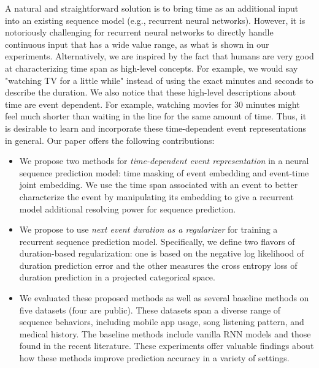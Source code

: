 \documentclass{article} %
\begin{document}
A natural and straightforward solution is to bring time as an additional input into an existing sequence model (e.g., recurrent neural networks). However, it is notoriously challenging for recurrent neural networks to directly handle continuous input that has a wide value range, as what is shown in our experiments. Alternatively, we are inspired by the fact that humans are very good at characterizing time span as high-level concepts. For example, we would say "watching TV for a little while" instead of using the exact minutes and seconds to describe the duration. We also notice that these high-level descriptions about time are event dependent. For example, watching movies for 30 minutes might feel much shorter than waiting in the line for the same amount of time. Thus, it is desirable to learn and incorporate these time-dependent event representations in general. Our paper offers the following contributions:
\begin{itemize}
\item{We propose two methods for \textit{time-dependent event representation} in a neural sequence prediction model: time masking of event embedding and event-time joint embedding. We use the time span associated with an event to better characterize the event by manipulating its embedding to give a recurrent model additional resolving power for sequence prediction.}

\item{We propose to use \textit{next event duration as a regularizer} for training a recurrent sequence prediction model. Specifically, we define two flavors of duration-based regularization: one is based on the negative log likelihood of duration prediction error and the other measures the cross entropy loss of duration prediction in a projected categorical space.}

\item We evaluated these proposed methods as well as several baseline methods on five datasets (four are public). These datasets span a diverse range of sequence behaviors, including mobile app usage, song listening pattern, and medical history. The baseline methods include vanilla RNN models and those found in the recent literature. These experiments offer valuable findings about how these methods improve prediction accuracy in a variety of settings.
\end{itemize}
\end{document}
